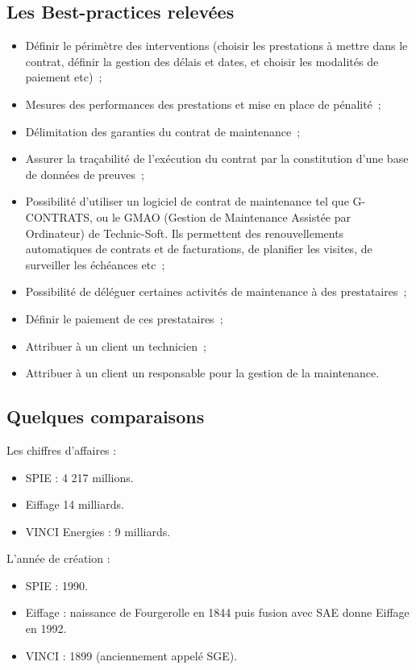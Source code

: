     \subsection{Les Best-practices relevées}
        \begin{itemize}
        	\item Définir le périmètre des interventions (choisir les prestations à mettre dans le contrat, définir la gestion des délais et dates, et choisir les modalités de paiement etc)~;
        	\item Mesures des performances des prestations et mise en place de pénalité~;
        	\item Délimitation des garanties du contrat de maintenance~;
        	\item Assurer la traçabilité de l'exécution du contrat par la constitution d'une base de données de preuves~;
        	\item Possibilité d'utiliser un logiciel de contrat de maintenance tel que G-CONTRATS, ou le GMAO (Gestion de Maintenance Assistée par Ordinateur) de Technic-Soft. Ils permettent des renouvellements automatiques de contrats et de facturations, de planifier les visites, de surveiller les échéances etc~;
        	\item Possibilité de déléguer certaines activités de maintenance à des prestataires~;
        	\item Définir le paiement de ces prestataires~;
		\item Attribuer à un client un technicien~;
		\item Attribuer à un client un responsable pour la gestion de la maintenance.
        \end{itemize}

	\subsection{Quelques comparaisons}
        Les chiffres d'affaires :
        \begin {itemize}
        	\item SPIE : 4 217 millions.
        	\item Eiffage 14 milliards.
        	\item VINCI Energies : 9 milliards.
        \end{itemize}

        L'année de création :
        \begin {itemize}
        	\item SPIE : 1990.
        	\item Eiffage : naissance de Fourgerolle en 1844 puis fusion avec SAE donne Eiffage en 1992.
        	\item VINCI : 1899 (anciennement appelé SGE).
        \end{itemize}

